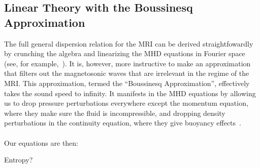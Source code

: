 \subsection{Linear Theory with the Boussinesq Approximation}\label{ssec:mriLinear}
The full general dispersion relation for the MRI can be derived straightfowardly by crunching the algebra and linearizing the MHD equations in Fourier space (see, for example,~\cite{BH1991a}). It is, however, more instructive to make an approximation that filters out the magnetosonic waves that are irrelevant in the regime of the MRI. This approximation, termed the ``Boussinesq Approximation'', effectively takes the sound speed to infinity. It manifests in the MHD equations by allowing us to drop pressure perturbations everywhere except the momentum equation, where they make sure the fluid is incompressible, and dropping density perturbations in the continuity equation, where they give buoyancy effects~\cite{KunzBoussNotes}.\\
\\
Our equations are then:

Entropy? 
